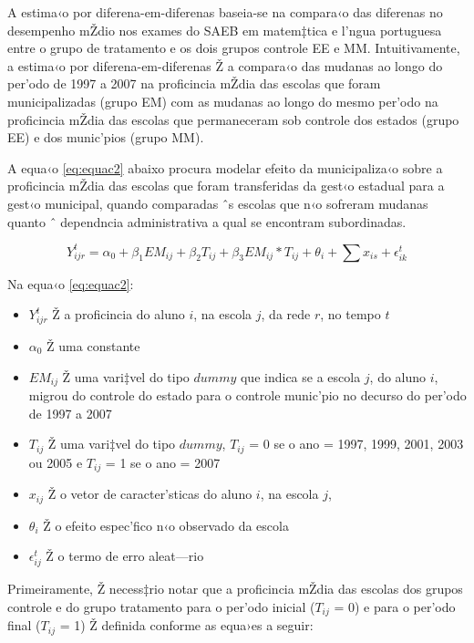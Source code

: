 \documentclass[a4paper, 12pt]{article}
\begin{document}
A estima‹o por diferena-em-diferenas baseia-se na compara‹o das diferenas no desempenho mŽdio nos exames do SAEB em matem‡tica e l’ngua portuguesa entre o grupo de tratamento e os dois grupos controle EE e MM. Intuitivamente, a estima‹o por diferena-em-diferenas Ž a compara‹o das mudanas ao longo do per’odo de 1997 a 2007 na proficincia mŽdia das escolas que foram municipalizadas (grupo EM) com as mudanas ao longo do mesmo per’odo na proficincia mŽdia das escolas que permaneceram sob controle dos estados (grupo EE) e dos munic’pios (grupo MM). 

A equa‹o  \ref{eq:equac2} abaixo procura modelar efeito da municipaliza‹o sobre a proficincia mŽdia das escolas que foram transferidas da gest‹o estadual para a gest‹o municipal, quando comparadas ˆs escolas que n‹o sofreram mudanas quanto ˆ dependncia administrativa a qual se encontram subordinadas.


\begin{equation}
 Y_{ijr}^{t} = \alpha_0 + \beta_1 EM_{ij}  + \beta_2 T_{ij} + \beta_3 EM_{ij} * T_{ij} + \theta_{i}  +  \sum x_{is} + \epsilon_{ik}^{t} \label{eq:equac2}
\end{equation}



Na equa‹o \ref{eq:equac2}:
\begin{itemize}
\item $Y_{ijr}^{t}$ Ž a proficincia do aluno $i$, na escola $j$, da rede $r$, no tempo $t$
\item$\alpha_0$ Ž uma constante
\item$EM_{ij}$ Ž uma vari‡vel do tipo $dummy$ que indica se a escola $j$, do aluno $i$,  migrou do controle do estado para o controle munic’pio no decurso do per’odo de 1997 a 2007
\item$T_{ij}$ Ž uma vari‡vel do tipo $dummy$, $T_{ij}$ = 0 se o ano = 1997, 1999, 2001, 2003 ou 2005 e $T_{ij}$ = 1 se o ano = 2007
\item$x_{ij}$ Ž o vetor de caracter’sticas do aluno $i$, na escola $j$,
\item$\theta_{i}$ Ž o efeito espec’fico n‹o observado da escola
\item$\epsilon_{ij}^{t}$ Ž o termo de erro aleat—rio 
\end{itemize}

Primeiramente, Ž necess‡rio notar que a proficincia mŽdia das escolas dos grupos controle e do grupo tratamento para o per’odo inicial ($T_{ij}$ = 0) e para o per’odo final ($T_{ij}$ = 1) Ž definida conforme as equa›es a seguir:
\end{document}
